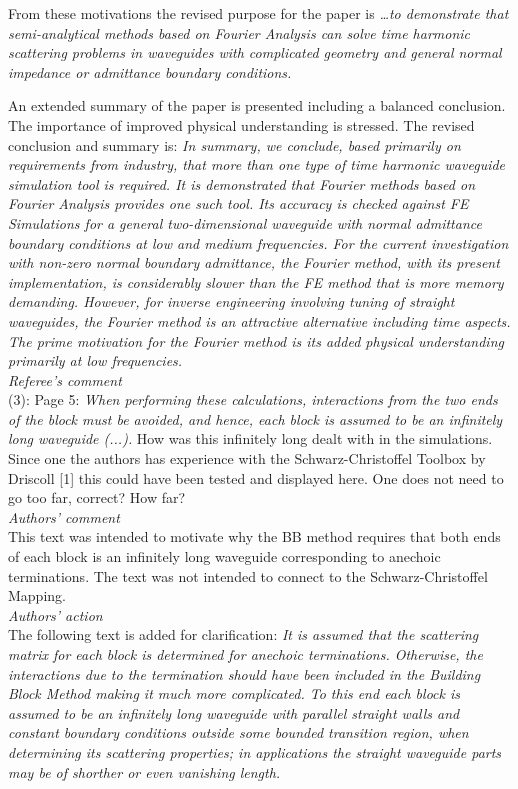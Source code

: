 \documentclass[a4paper,12pt]{article}%
\begin{document}
From these motivations the revised purpose for the paper is
\emph{\ldots to demonstrate that semi-analytical methods based on
  Fourier Analysis can solve time harmonic scattering problems in
  waveguides with complicated geometry and general normal impedance or
  admittance boundary conditions.}

An extended summary of the paper is presented including a balanced
conclusion. The importance of improved physical understanding is
stressed. The revised conclusion and summary is: \emph{ In summary, we
  conclude, based primarily on requirements from industry, that more
  than one type of time harmonic waveguide simulation tool is
  required. It is demonstrated that Fourier methods based on Fourier
  Analysis provides one such tool. Its accuracy is checked against FE
  Simulations for a general two-dimensional waveguide with normal
  admittance boundary conditions at low and medium frequencies. For
  the current investigation with non-zero normal boundary admittance,
  the Fourier method, with its present implementation, is considerably
  slower than the FE method that is more memory demanding. However,
  for inverse engineering involving tuning of straight waveguides, the
  Fourier method is an attractive alternative including time
  aspects. The prime motivation for the Fourier method is its added
  physical understanding primarily
  at low frequencies.}\\
\newline
{\it Referee's comment}\\
(3): Page 5: \textit{When performing these calculations, interactions
  from the two ends of the block must be avoided, and hence, each
  block is assumed to be an infinitely long waveguide (...).} How was
this infinitely long dealt with in the simulations. Since one the
authors has experience with the Schwarz-Christoffel Toolbox by
Driscoll [1] this could have been tested and displayed here. One does
not need to go too far, correct? How
far?\\
{\it Authors' comment}\\
This text was intended to motivate why the BB method requires that
both ends of each block is an infinitely long waveguide corresponding
to anechoic terminations. The text was not intended to connect to the
Schwarz-Christoffel Mapping.\\
{\it Authors' action}\\
The following text is added for clarification: \emph{It is assumed
  that the scattering matrix for each block is determined for anechoic
  terminations. Otherwise, the interactions due to the termination
  should have been included in the Building Block Method making it
  much more complicated. To this end each block is assumed to be an
  infinitely long waveguide with parallel straight walls and constant
  boundary conditions outside some bounded transition region, when
  determining its scattering properties; in applications the straight
  waveguide parts may be of shorther or even vanishing length.}\\
\end{document}
